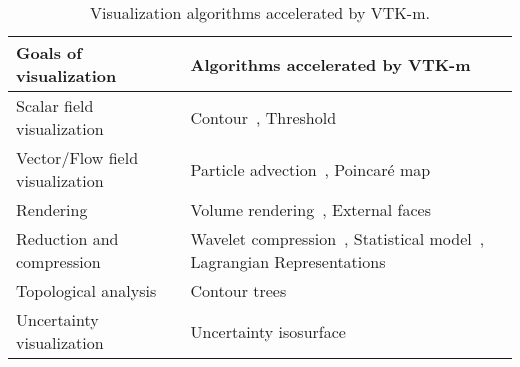\begin{table*}[htbp]
\caption{
Visualization algorithms accelerated by VTK-m.
}
\label{tab:summarytable}
\begin{tabularx}{\textwidth}{lX}
\toprule
    Goals of visualization & Algorithms accelerated by VTK-m\\
    \midrule
    Scalar field visualization & Contour~\cite{Lo2012}, Threshold~\cite{Maynard2013}  \\
    Vector/Flow field visualization & Particle advection~\cite{Pugmire2018}, Poincar\'{e} map~\cite{suchyta2022hybrid}  \\
    Rendering & Volume rendering~\cite{Larsen2015:VR,Larsen2015:RayTrace}, External faces \cite{Lessley2016}  \\
    Reduction and compression &
    Wavelet compression~\cite{li2017achieving}, Statistical model~\cite{wang2019statistical},  Lagrangian Representations~\cite{sane2021investigating}  \\
    Topological analysis & Contour trees~\cite{carr2021optimization}  \\
    Uncertainty visualization & Uncertainty isosurface~\cite{wang2023funmc}  \\
\bottomrule
\end{tabularx}
\end{table*}

